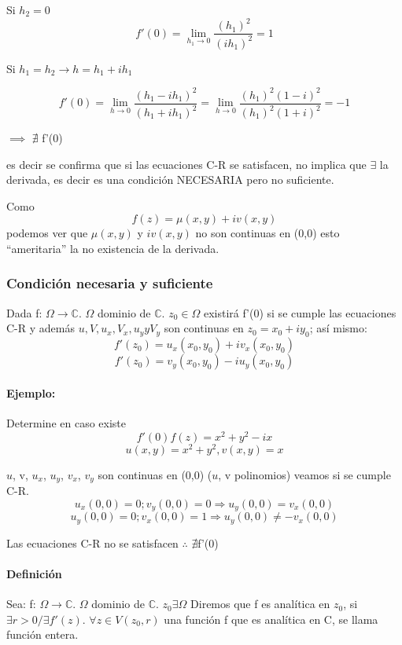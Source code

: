 \documentclass[a4paper,12pt]{article}
\begin{document}
Si $h_2 = 0$
\[
f'(0) = \lim_{h_1 \rightarrow 0} \frac{(h_1)^2}{(ih_1)^2} = 1
\]

Si $h_1 = h_2 \rightarrow h = h_1 + ih_1$

\[
f'(0) = \lim_{h \rightarrow 0} \frac{(h_1 - ih_1)^2}{(h_1 + ih_1)^2} = \lim_{h \rightarrow 0} \frac{(h_1)^2 (1 - i)^2}{(h_1)^2 (1 + i)^2} = -1
\]

$\implies$ $\nexists$ f'(0)

es decir se confirma que si las ecuaciones C-R se satisfacen, no implica que $\exists$ la derivada, es decir es una condición NECESARIA pero no suficiente.

Como \[f(z) = \mu(x, y) + iv(x, y)\] podemos ver que $\mu(x, y)$ y $iv(x, y)$ no son continuas en (0,0) esto “ameritaria” la no existencia de la derivada.

\subsubsection{Condición necesaria y suficiente}

Dada f: $\Omega \rightarrow \mathbb{C}$. $\Omega$ dominio de $\mathbb{C}$.
$z_0 \in \Omega$ existirá f'(0) si se cumple las ecuaciones C-R y además $u, V, u_x, V_x, u_y y V_y$ son continuas en $z_0 = x_0 + iy_0$; así mismo:
\[
f'(z_0) = u_x(x_0, y_0) + iv_x(x_0, y_0)
\]
\[
f'(z_0) = v_y(x_0, y_0) - iu_y(x_0, y_0)
\]

\paragraph{Ejemplo:}
Determine en caso existe \[f'(0)  f(z)=x^2 + y^2 - ix\]
\[u(x, y) = x^2 + y^2, v(x, y) = x\]

$u$, v, $u_x$, $u_y$, $v_x$, $v_y$ son continuas en (0,0) ($u$, v polinomios) veamos si se cumple C-R.
\[
u_x(0, 0) = 0; v_y(0, 0) = 0 \Rightarrow u_y(0, 0) = v_x(0, 0)
\]
\[
u_y(0, 0) = 0; v_x(0, 0) = 1 \Rightarrow u_y(0, 0) \neq -v_x(0, 0)
\]


Las ecuaciones C-R no se satisfacen $\therefore$ $\nexists$f'(0)

\paragraph{Definición}

Sea: f: $\Omega \rightarrow \mathbb{C}$. $\Omega$ dominio de $\mathbb{C}$. $z_0 \exists \Omega$
Diremos que f es analítica en $z_0$, si $\exists r > 0 / \exists f'(z)$. $\forall z \in V(z_0, r)$ una función f que es analítica en C, se llama función entera.
\end{document}
